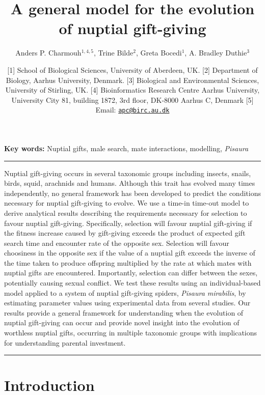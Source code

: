 \documentclass[
]{article}
\title{A general model for the evolution of nuptial gift-giving}
\author{Anders P. Charmouh\(^{1,4, 5}\), Trine Bilde\(^{2}\), Greta
Bocedi\(^{1}\), A. Bradley Duthie\(^{3}\)}
\date{{[}1{]} School of Biological Sciences, University of Aberdeen, UK.
{[}2{]} Department of Biology, Aarhus University, Denmark. {[}3{]}
Biological and Environmental Sciences, University of Stirling, UK.
{[}4{]} Bioinformatics Research Centre Aarhus University, University
City 81, building 1872, 3rd floor, DK-8000 Aarhus C, Denmark {[}5{]}
Email: \href{mailto:apc@birc.au.dk}{\nolinkurl{apc@birc.au.dk}}}
\begin{document}
\maketitle

\textbf{Key words:} Nuptial gifts, male search, mate interactions,
modelling, \emph{Pisaura}

\begin{center}\rule{0.5\linewidth}{0.5pt}\end{center}

Nuptial gift-giving occurs in several taxonomic groups including
insects, snails, birds, squid, arachnids and humans. Although this trait
has evolved many times independently, no general framework has been
developed to predict the conditions necessary for nuptial gift-giving to
evolve. We use a time-in time-out model to derive analytical results
describing the requirements necessary for selection to favour nuptial
gift-giving. Specifically, selection will favour nuptial gift-giving if
the fitness increase caused by gift-giving exceeds the product of
expected gift search time and encounter rate of the opposite sex.
Selection will favour choosiness in the opposite sex if the value of a
nuptial gift exceeds the inverse of the time taken to produce offspring
multiplied by the rate at which mates with nuptial gifts are
encountered. Importantly, selection can differ between the sexes,
potentially causing sexual conflict. We test these results using an
individual-based model applied to a system of nuptial gift-giving
spiders, \emph{Pisaura mirabilis}, by estimating parameter values using
experimental data from several studies. Our results provide a general
framework for understanding when the evolution of nuptial gift-giving
can occur and provide novel insight into the evolution of worthless
nuptial gifts, occurring in multiple taxonomic groups with implications
for understanding parental investment.

\begin{center}\rule{0.5\linewidth}{0.5pt}\end{center}

\hypertarget{introduction}{%
\section{Introduction}\label{introduction}}
\end{document}
